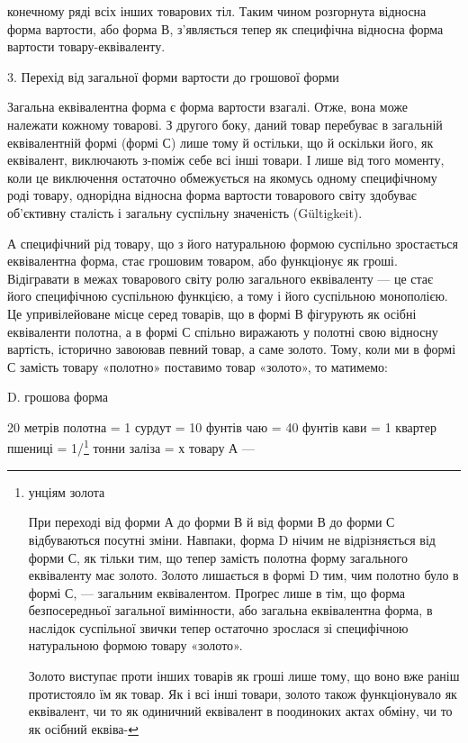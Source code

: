 конечному ряді всіх інших товарових тіл. Таким чином розгорнута
відносна форма вартости, або форма В, з’являється тепер
як специфічна відносна форма вартости товару-еквіваленту.

3. Перехід від загальної форми вартости до грошової форми

Загальна еквівалентна форма є форма вартости взагалі. Отже,
вона може належати кожному товарові. З другого боку, даний
товар перебуває в загальній еквівалентній формі (формі С) лише
тому й остільки, що й оскільки його, як еквівалент, виключають
з-поміж себе всі інші товари. І лише від того моменту, коли це
виключення остаточно обмежується на якомусь одному специфічному
роді товару, однорідна відносна форма вартости товарового
світу здобуває об’єктивну сталість і загальну суспільну значеність
(Gültigkeit).

А специфічний рід товару, що з його натуральною формою
суспільно зростається еквівалентна форма, стає грошовим товаром,
або функціонує як гроші. Відігравати в межах товарового
світу ролю загального еквіваленту — це стає його специфічною
суспільною функцією, а тому і його суспільною монополією. Це
упривілейоване місце серед товарів, що в формі В фігурують як
осібні еквіваленти полотна, а в формі С спільно виражають у
полотні свою відносну вартість, історично завоював певний товар,
а саме золото. Тому, коли ми в формі С замість товару
«полотно» поставимо товар «золото», то матимемо:

D. грошова форма

20 метрів полотна =
1 сурдут =
10 фунтів чаю =
40 фунтів кави =
1 квартер пшениці =
1/\footnote{
унціям золота

При переході від форми А до форми В й від форми В до форми
С відбуваються посутні зміни. Навпаки, форма D нічим не
відрізняється від форми С, як тільки тим, що тепер замість полотна
форму загального еквіваленту має золото. Золото лишається
в формі D тим, чим полотно було в формі С, — загальним
еквівалентом. Проґрес лише в тім, що форма безпосередньої загальної
вимінности, або загальна еквівалентна форма, в наслідок
суспільної звички тепер остаточно зрослася зі специфічною натуральною
формою товару «золото».

Золото виступає проти інших товарів як гроші лише тому, що
воно вже раніш протистояло їм як товар. Як і всі інші товари,
золото також функціонувало як еквівалент, чи то як одиничний
еквівалент в поодиноких актах обміну, чи то як осібний еквіва-
}  тонни заліза =
х товару А —